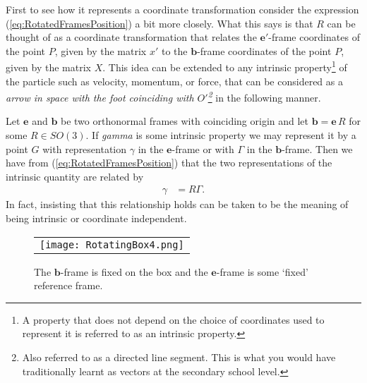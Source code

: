 \documentclass[graybox,envcountchap,sectrefs]{svmonoMuga}
\begin{document}
First to see how it represents a coordinate transformation consider the expression 
(\ref{eq:RotatedFramesPosition}) a bit more closely. 
What this says is that $R$ can be thought of as a coordinate transformation that relates the $\mathbf{e}'$-frame coordinates of the point $P$, given by the matrix $x'$ to the $\mathbf{b}$-frame coordinates of the point $P$, given by the matrix $X$. This idea can be extended to any intrinsic property\footnote{A property that does not depend on the choice of coordinates used to represent it is referred to as an intrinsic property.} of the particle such as velocity, momentum, or force, that can be considered as a \textit{arrow in space with the foot coinciding with $O'$\footnote{Also referred to as a directed line segment. This is what you would have traditionally learnt as vectors at the secondary school level.}} in the following manner. 
\begin{svgraybox}
Let $\mathbf{e}$ and $\mathbf{b}$ be two orthonormal frames with coinciding origin and let $\mathbf{b}=\mathbf{e}\,R$ for some $R\in SO(3)$.
If \textit{gamma} is some intrinsic property we may represent it by a point $G$ with representation $\gamma$ in the $\mathbf{e}$-frame or with $\Gamma$ in the $\mathbf{b}$-frame. Then we have from (\ref{eq:RotatedFramesPosition}) that the two representations of the intrinsic quantity are related by
\begin{align}
\gamma&=R\Gamma.\label{eq:IntrinsicProperty}
\end{align}
In fact, insisting that this relationship holds can be taken to be the meaning of being intrinsic or coordinate independent.
\end{svgraybox}







\begin{figure}[ht]
\begin{center}
\begin{tabular}{c}
\texttt{[image: RotatingBox4.png]} 
\end{tabular}
\renewcommand{\baselinestretch}{1}\selectfont
\caption{The $\mathbf{b}$-frame is fixed on the box and the $\mathbf{e}$-frame is some `fixed' reference frame.}
\label{Fig:RotatingBox}
\renewcommand{\baselinestretch}{1.5}\selectfont
\end{center}
\end{figure}
\end{document}

